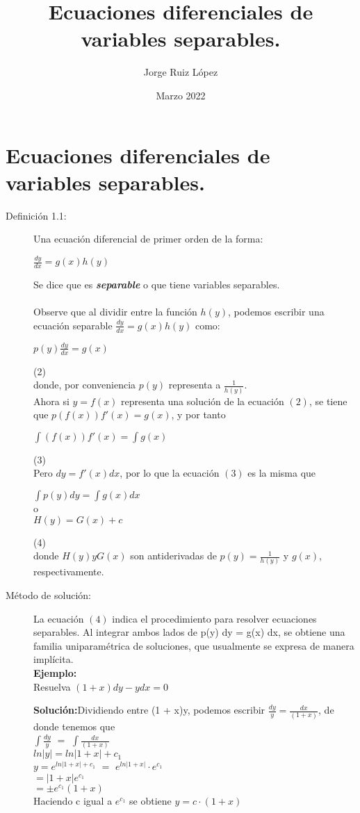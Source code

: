 \documentclass{article}
\title{Ecuaciones diferenciales de variables separables.}
\author{Jorge Ruiz López}
\affil{Facultad de Ingeniería UNAM}
\date{Marzo 2022}
\begin{document}
\maketitle
\section{Ecuaciones diferenciales de variables separables.}
\begin{description}
\item[Definición 1.1:]Una ecuación diferencial  de primer orden de la forma:\\
\begin{center}$\frac{dy}{dx} = g(x)h(y)$\end{center}
Se dice que es \cite{zill}\textbf{\textit{separable}} o que tiene variables separables.\\\\
Observe que al dividir entre la función $h(y)$, podemos escribir una ecuación separable $\frac{dy}{dx} = g(x)h(y)$ como:
\begin{center}$p(y)\frac{dy}{dx}=g(x)$\end{center}\tab(2)\\\break
donde, por conveniencia $p(y)$ representa a $\frac{1}{h(y)}$.\\
Ahora si $y = f(x)$ representa una solución de la ecuación $(2)$, se tiene que 
$p(f(x))f'(x) = g(x)$, y por tanto
\begin{center}$\int (f(x))f'(x) = \int g(x) $\end{center}\tab(3)\\\break
Pero $dy = f'(x)dx$, por lo que la ecuación $(3)$ es la misma que
\begin{center}
    $\int p(y) dy = \int g(x) dx$\\o\\$H(y) = G(x)+c$
\end{center}\tab(4)\\\break
donde $H(y) y G(x)$ son antiderivadas de $p(y) = \frac{1}{h(y)}$ y $g(x)$, respectivamente.
\item[Método de solución:]La ecuación $(4)$ indica el procedimiento para resolver 
ecuaciones separables. Al integrar ambos lados de p(y) dy = g(x) dx, se obtiene una familia uniparamétrica de soluciones, que usualmente se expresa de manera implícita.\\
\textbf{Ejemplo:}\\Resuelva $(1 + x)dy - ydx = 0$
\begin{center}
    \textbf{Solución:}Dividiendo entre (1 + x)y, podemos escribir $\frac{dy}{y} = \frac{dx}{(1+x)}$, de donde tenemos que\\
    $\int \frac{dy}{y}$ $=$ $\int \frac{dx}{(1+x)}$\\
    $ln|y| = ln|1+x|+c_1$\\
    $y=e^{ln|1+x|+c_1}$ $=$ $e^{ln|1+x|}\cdot e^{c_1}$\\
    $=|1+x|e^{c_1}$\\
    $=\pm e^{c_1}(1+x)$\\
    Haciendo c igual a $e^{c_1}$ se obtiene \underline{ \textbf{$y=c\cdot (1+x)$}}\\
\end{center}
\end{description}
\printbibliography
\end{document}
